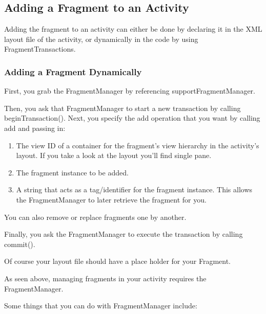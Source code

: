 \subsection{Adding a Fragment to an Activity}

Adding the fragment to an activity can either be done by declaring it in the XML layout file of the activity, or dynamically in the code by using FragmentTransactions.

\subsubsection{Adding a Fragment Dynamically}
First, you grab the FragmentManager by referencing supportFragmentManager.

Then, you ask that FragmentManager to start a new transaction by calling beginTransaction(). Next, you specify the add operation that you want by calling add and passing in:

\begin{enumerate}
\item The view ID of a container for the fragment’s view hierarchy in the activity’s layout. If you take a look at the layout you'll find single pane.
\item The fragment instance to be added.
\item A string that acts as a tag/identifier for the fragment instance. This allows the FragmentManager to later retrieve the fragment for you.
\end{enumerate}

You can also remove or replace fragments one by another. 

Finally, you ask the FragmentManager to execute the transaction by calling commit().



Of course your layout file should have a place holder for your Fragment.



As seen above, managing fragments in your activity requires the FragmentManager. 

Some things that you can do with FragmentManager include:


